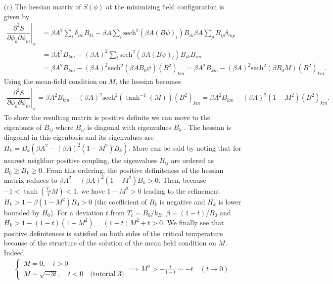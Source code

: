 \documentclass[10pt, a4paper]{article}
\begin{document}
{\begin{enumerate}
  \item[(c)]  The hessian matrix of $S(\phi)$ at the minimizing field configuration is given by 
  \begin{align*}
    \left.\dfrac{\partial^2 S}{\partial \phi_k \partial \phi_m}\right|_{\psi} &= \beta A^2 \sum_{i} \delta_{im} B_{ki}-\beta A \sum_i \text{sech}^2 \left(\beta A(B \psi)_i\right) B_{ik} \beta A \sum_{p}B_{i p} \delta_{mp} \\
    &= \beta A^2  B_{km}-(\beta A)^2 \sum_i \text{sech}^2 \left(\beta A(B \psi)_i\right) B_{ik} B_{i m} \\
    &= \beta A^2  B_{km}-(\beta A)^2 \text{sech}^2 \left(\beta A B_0 \bar{\psi}\right) (B^2)_{k m} = \beta A^2  B_{km}-(\beta A)^2 \text{sech}^2 \left(\beta B_0 M\right) (B^2)_{k m}.
  \end{align*}
  Using the mean-field condition on $M$, the hessian becomes 
  \begin{align*}
    \left.\dfrac{\partial^2 S}{\partial \phi_k \partial \phi_m}\right|_{\psi} = \beta A^2  B_{km}-(\beta A)^2 \text{sech}^2 \left(\tanh^{-1}(M)\right) (B^2)_{k m} = \beta A^2  B_{km}-(\beta A)^2 (1-M^2) (B^2)_{k m}.
  \end{align*}
  To show the resulting matrix is positive definite we can move to the eigenbasis of $B_{ij}$ where $B_{ij}$ is diagonal with eigenvalues $B_k$ \cite{CitekeyBook}. The hessian is diagonal in this eigenbasis and its eigenvalues are $H_k = B_k(\beta A^2 -(\beta A)^2 (1-M^2) B_k)$. More can be said by noting that for nearest neighbor positive coupling, the eigenvalues $B_{ij}$ are ordered as $B_0 \ge B_k \ge 0$. From this ordering, the positive definiteness of the hessian matrix reduces to $\beta A^2 -(\beta A)^2 (1-M^2) B_k > 0$. Then, because $-1 < \tanh \left(\frac{T_c}{T}M\right) < 1$, we have $1-M^2 > 0$ leading to the refinement $H_k > 1 - \beta (1-M^2) B_0 > 0$ (the coefficient of $B_k$ is negative and $H_k$ is lower bounded by $H_0$). For a deviation $t$ from $T_c = B_0/k_B$, $\beta = (1-t)/B_0$ and $H_k > 1 - (1-t) (1-M^2) =  (1-t) M^2 + t> 0$. We finally see that positive definiteness is satisfied on both sides of the critical temperature because of the structure of the solution of the mean field condition on $M$. Indeed
  \begin{align*}
    \begin{cases}
      M = 0, \quad t > 0 \\
      M \sim \sqrt{-3t}, \quad t < 0 \quad \text{(tutorial 3)}
     \end{cases} 
     \implies M^2 > -\frac{t}{1-t} \sim -t \quad (t \to 0).

\end{align*}
\end{enumerate}}
\end{document}
